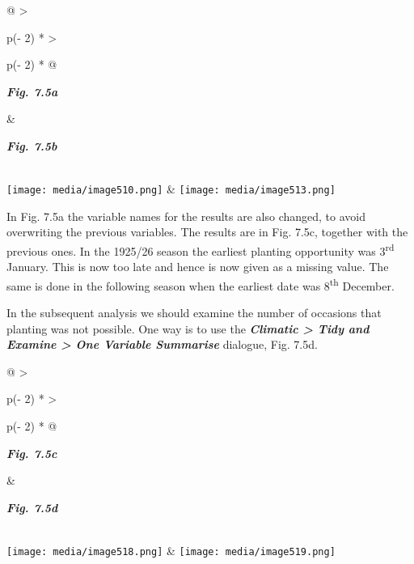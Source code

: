\documentclass[
  letterpaper,
  DIV=11,
  numbers=noendperiod]{scrreprt}
\begin{document}
\begin{longtable}[]{@{}
  >{\raggedright\arraybackslash}p{(\columnwidth - 2\tabcolsep) * }
  >{\raggedright\arraybackslash}p{(\columnwidth - 2\tabcolsep) * }@{}}
\toprule\noalign{}
\begin{minipage}[b]{\linewidth}\raggedright
\textbf{\emph{Fig. 7.5a}}
\end{minipage} & \begin{minipage}[b]{\linewidth}\raggedright
\textbf{\emph{Fig. 7.5b}}
\end{minipage} \\
\midrule\noalign{}
\endhead
\bottomrule\noalign{}
\endlastfoot
\texttt{[image: media/image510.png]} &
\texttt{[image: media/image513.png]} \\
\end{longtable}

In Fig. 7.5a the variable names for the results are also changed, to
avoid overwriting the previous variables. The results are in Fig. 7.5c,
together with the previous ones. In the 1925/26 season the earliest
planting opportunity was 3\textsuperscript{rd} January. This is now too
late and hence is now given as a missing value. The same is done in the
following season when the earliest date was 8\textsuperscript{th}
December.

In the subsequent analysis we should examine the number of occasions
that planting was not possible. One way is to use the
\textbf{\emph{Climatic \textgreater{} Tidy and Examine \textgreater{}
One Variable Summarise}} dialogue, Fig. 7.5d.

\begin{longtable}[]{@{}
  >{\raggedright\arraybackslash}p{(\columnwidth - 2\tabcolsep) * }
  >{\raggedright\arraybackslash}p{(\columnwidth - 2\tabcolsep) * }@{}}
\toprule\noalign{}
\begin{minipage}[b]{\linewidth}\raggedright
\textbf{\emph{Fig. 7.5c}}
\end{minipage} & \begin{minipage}[b]{\linewidth}\raggedright
\textbf{\emph{Fig. 7.5d}}
\end{minipage} \\
\midrule\noalign{}
\endhead
\bottomrule\noalign{}
\endlastfoot
\texttt{[image: media/image518.png]} &
\texttt{[image: media/image519.png]} \\
\end{longtable}
\end{document}
